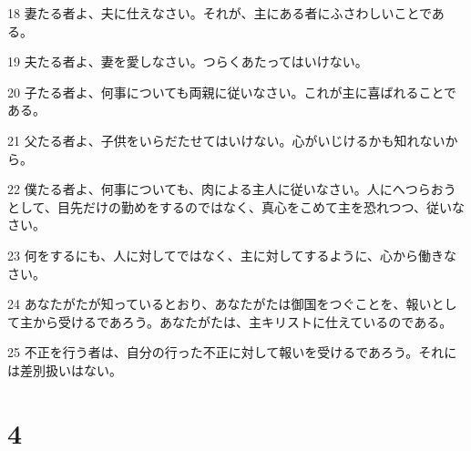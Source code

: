 \par 18 妻たる者よ、夫に仕えなさい。それが、主にある者にふさわしいことである。
\par 19 夫たる者よ、妻を愛しなさい。つらくあたってはいけない。
\par 20 子たる者よ、何事についても両親に従いなさい。これが主に喜ばれることである。
\par 21 父たる者よ、子供をいらだたせてはいけない。心がいじけるかも知れないから。
\par 22 僕たる者よ、何事についても、肉による主人に従いなさい。人にへつらおうとして、目先だけの勤めをするのではなく、真心をこめて主を恐れつつ、従いなさい。
\par 23 何をするにも、人に対してではなく、主に対してするように、心から働きなさい。
\par 24 あなたがたが知っているとおり、あなたがたは御国をつぐことを、報いとして主から受けるであろう。あなたがたは、主キリストに仕えているのである。
\par 25 不正を行う者は、自分の行った不正に対して報いを受けるであろう。それには差別扱いはない。

\chapter{4}

